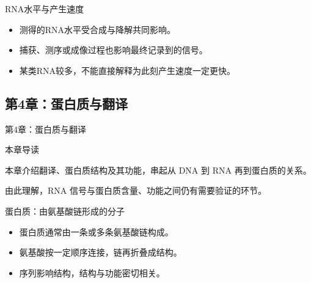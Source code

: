 \begin{frame}{RNA水平与产生速度}\relax
\begin{itemize}\wideitems
\item 测得的RNA水平受合成与降解共同影响。
\item 捕获、测序或成像过程也影响最终记录到的信号。
\item 某类RNA较多，不能直接解释为此刻产生速度一定更快。
\end{itemize}
\end{frame}

\subsection{第4章：蛋白质与翻译}

\begin{frame}{第4章：蛋白质与翻译}\relax
\vfill\begin{center}\begin{minipage}{.86\linewidth}
{\large\color{AcademicBlue}本章导读\par}\vspace{4mm}
{\Large 本章介绍翻译、蛋白质结构及其功能，串起从 DNA 到 RNA 再到蛋白质的关系。\par\vspace{4mm}由此理解，RNA 信号与蛋白质含量、功能之间仍有需要验证的环节。\par}
\end{minipage}\end{center}\vfill
{}
\end{frame}

\begin{frame}{蛋白质：由氨基酸链形成的分子}\relax
\begin{itemize}\wideitems
\item 蛋白质通常由一条或多条氨基酸链构成。
\item 氨基酸按一定顺序连接，链再折叠成结构。
\item 序列影响结构，结构与功能密切相关。
\end{itemize}
\end{frame}

